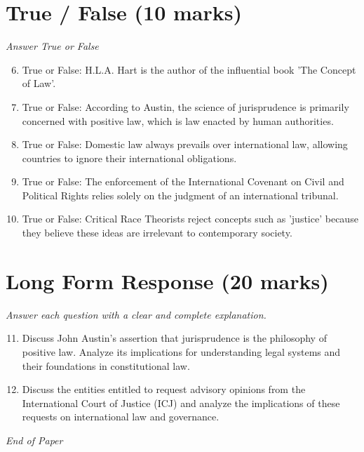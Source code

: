 \documentclass[12pt]{article}
\begin{document}
\section*{True / False (10 marks)}
\textit{Answer True or False}
\begin{enumerate}[label=\arabic*.]
\setcounter{enumi}{5}
\item True or False: H.L.A. Hart is the author of the influential book 'The Concept of Law'.
\item True or False: According to Austin, the science of jurisprudence is primarily concerned with positive law, which is law enacted by human authorities.
\item True or False: Domestic law always prevails over international law, allowing countries to ignore their international obligations.
\item True or False: The enforcement of the International Covenant on Civil and Political Rights relies solely on the judgment of an international tribunal.
\item True or False: Critical Race Theorists reject concepts such as 'justice' because they believe these ideas are irrelevant to contemporary society.
\end{enumerate}

\section*{Long Form Response (20 marks)}
\textit{Answer each question with a clear and complete explanation.}
\begin{enumerate}[label=\arabic*.]
\setcounter{enumi}{10}
\item Discuss John Austin's assertion that jurisprudence is the philosophy of positive law. Analyze its implications for understanding legal systems and their foundations in constitutional law.
\item Discuss the entities entitled to request advisory opinions from the International Court of Justice (ICJ) and analyze the implications of these requests on international law and governance.
\end{enumerate}

\vfill
\noindent\textit{End of Paper}
\end{document}
